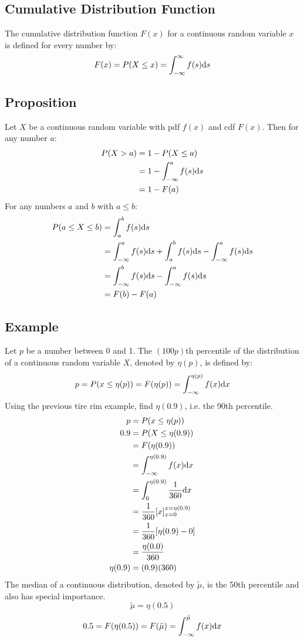 \documentclass{math}
\begin{document}
\subsection*{Cumulative Distribution Function}
The cumulative distribution function \( F(x) \) for a continuous random variable
\( x \) is defined for every number by:
\[ F(x) = P(X\leq x) = \int_{-\infty}^{\infty}f(s)\mathrm{d}{s} \]

\subsection*{Proposition}
Let \( X \) be a continuous random variable with pdf \( f(x) \) and cdf
\( F(x) \). Then for any number \( a \):
\begin{align*}
  P(X>a) &= 1-P(X\leq a) \\
  &= 1-\int_{-\infty}^{a}f(s)\mathrm{d}{s} \\
  &= 1-F(a)
\end{align*}
For any numbers \( a \) and \( b \) with \( a \leq b \):
\begin{align*}
  P(a\leq X\leq b) &= \int_{a}^{b}f(s)\mathrm{d}{s} \\
  &= \int_{-\infty}^{a}f(s)\mathrm{d}{s}+\int_{a}^{b}f(s)\mathrm{d}{s}-
    \int_{-\infty}^{a}f(s)\mathrm{d}{s} \\
  &= \int_{-\infty}^{b}f(s)\mathrm{d}{s}-\int_{-\infty}^{a}f(s)\mathrm{d}{s} \\
  &= F(b)-F(a)
\end{align*}

\subsection*{Example}
Let \( p \) be a number between 0 and 1. The \( (100p) \)th percentile of the
distribution of a continuous random variable \( X \), denoted by \( \eta(p) \),
is defined by:
\[ p = P(x\leq\eta(p)) = F(\eta(p)) = \int_{-\infty}^{\eta(p)}f(x)\mathrm{d}{x} \]
Using the previous tire rim example, find \( \eta(0.9) \), i.e. the 90th
percentile.
\begin{align*}
  p &= P(x\leq\eta(p)) \\
  0.9 &= P(X\leq\eta(0.9)) \\
  &= F(\eta(0.9)) \\
  &= \int_{-\infty}^{\eta(0.9)}f(x)\mathrm{d}{x} \\
  &= \int_{0}^{\eta(0.9)}\frac{1}{360}\mathrm{d}{x} \\
  &= \frac{1}{360}[x]_{x=0}^{x=\eta(0.9)} \\
  &= \frac{1}{360}[\eta(0.9)-0] \\
  &= \frac{\eta(0.0)}{360} \\
  \eta(0.9) &= (0.9)(360)
\end{align*}
The median of a continuous distribution, denoted by \( \tilde{\mu} \), is
the 50th percentile and also has special importance.
\[ \tilde{\mu} = \eta(0.5) \]
\[ 0.5 = F(\eta(0.5)) = F(\tilde{\mu}) =
   \int_{-\infty}^{\tilde{\mu}}f(x)\mathrm{d}{x} \]
\end{document}
